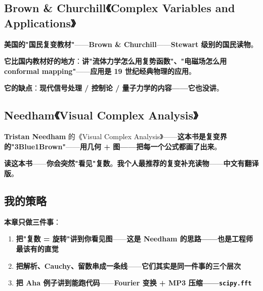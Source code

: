 \subsection{Brown \& Churchill《Complex Variables and Applications》}

\textbf{美国的"国民复变教材"}——\textbf{Brown \& Churchill}——\textbf{Stewart 级别的国民读物}。

\textbf{它比国内教材好的地方}：\textbf{讲"流体力学怎么用复势函数"、"电磁场怎么用 conformal mapping"}——\textbf{应用是 19 世纪经典物理的应用}。

\textbf{它的缺点}：\textbf{现代信号处理 / 控制论 / 量子力学的内容——它也没讲}。

\subsection{Needham《Visual Complex Analysis》}

\textbf{Tristan Needham} 的《Visual Complex Analysis》——\textbf{这本书是复变界的"3Blue1Brown"}——\textbf{用几何 + 图——把每一个公式都画了出来}。

\textbf{读这本书}——\textbf{你会突然"看见"复数}。\textbf{我个人最推荐的复变补充读物}——\textbf{中文有翻译版}。

\subsection{我的策略}

\textbf{本章只做三件事}：

\begin{enumerate}
\item \textbf{把"复数 = 旋转"讲到你看见图}——\textbf{这是 Needham 的思路——也是工程师最该有的直觉}
\item \textbf{把解析、Cauchy、留数串成一条线}——\textbf{它们其实是同一件事的三个层次}
\item \textbf{把 Aha 例子讲到能跑代码}——\textbf{Fourier 变换 + MP3 压缩——\texttt{scipy.fft}}
\end{enumerate}

